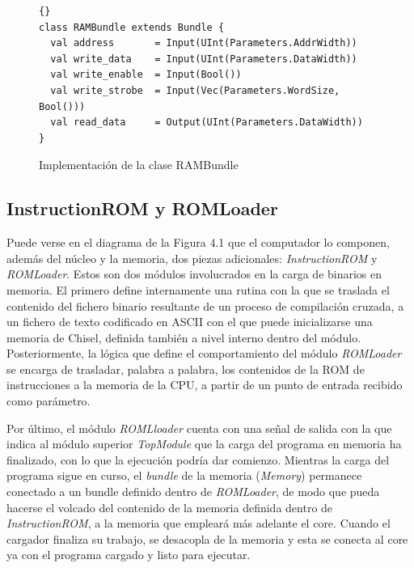 \begin{figure}[h]
  \centering
  \begin{minipage}{0.9\linewidth}
    \begin{lstlisting}[style=scalaStyle]{}
class RAMBundle extends Bundle {
  val address       = Input(UInt(Parameters.AddrWidth))
  val write_data    = Input(UInt(Parameters.DataWidth))
  val write_enable  = Input(Bool())
  val write_strobe  = Input(Vec(Parameters.WordSize, Bool()))
  val read_data     = Output(UInt(Parameters.DataWidth))
}
    \end{lstlisting}
    \caption{Implementación de la clase RAMBundle}
  \end{minipage}
\end{figure}

\subsection{InstructionROM y ROMLoader}

Puede verse en el diagrama de la Figura 4.1 que el computador lo componen, además del núcleo y la memoria, dos piezas adicionales: \textit{InstructionROM} y \textit{ROMLoader}. Estos son dos módulos involucrados en la carga de binarios en memoria. El primero define internamente una rutina con la que se traslada el contenido del fichero binario resultante de un proceso de compilación cruzada, a un fichero de texto codificado en ASCII con el que puede inicializarse una memoria de Chisel, definida también a nivel interno dentro del módulo. Posteriormente, la lógica que define el comportamiento del módulo \textit{ROMLoader} se encarga de trasladar, palabra a palabra, los contenidos de la ROM de instrucciones a la memoria de la CPU, a partir de un punto de entrada recibido como parámetro.

Por último, el módulo \textit{ROMLloader} cuenta con una señal de salida con la que indica al módulo superior \textit{TopModule} que la carga del programa en memoria ha finalizado, con lo que la ejecución podría dar comienzo. Mientras la carga del programa sigue en curso, el \textit{bundle} de la memoria (\textit{Memory}) permanece conectado a un bundle definido dentro de \textit{ROMLoader}, de modo que pueda hacerse el volcado del contenido de la memoria definida dentro de \textit{InstructionROM}, a la memoria que empleará más adelante el core. Cuando el cargador finaliza su trabajo, se desacopla de la memoria y esta se conecta al core ya con el programa cargado y listo para ejecutar.

